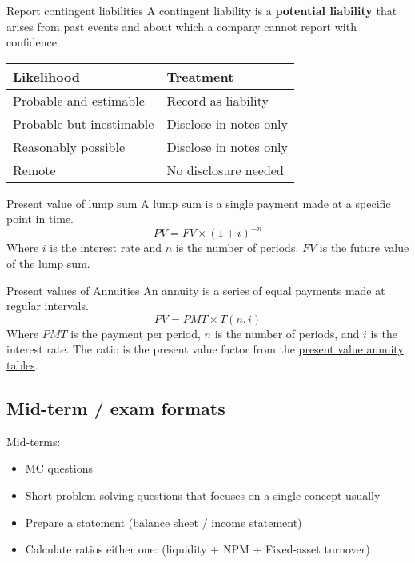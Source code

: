 \begin{theorem}
    {Report contingent liabilities}
    A contingent liability is a \textbf{potential liability} that arises from past events and about which a company cannot report with confidence.

    \begin{tabular}{|p{}|p{}|}
        \hline
        \textbf{Likelihood}      & \textbf{Treatment}     \\
        \hline
        Probable and estimable   & Record as liability    \\
        \hline
        Probable but inestimable & Disclose in notes only \\
        \hline
        Reasonably possible      & Disclose in notes only \\
        \hline
        Remote                   & No disclosure needed   \\
        \hline
    \end{tabular}
\end{theorem}

\begin{theorem}
    {Present value of lump sum}
    A lump sum is a single payment made at a specific point in time.
    \[PV = FV \times (1+i)^{-n}\]
    Where $i$ is the interest rate and $n$ is the number of periods. $FV$ is the future value of the lump sum.
\end{theorem}

\begin{theorem}
    {Present values of Annuities}
    An annuity is a series of equal payments made at regular intervals.
    \[PV = PMT \times T(n, i)\]
    Where $PMT$ is the payment per period,
    $n$ is the number of periods, and
    $i$ is the interest rate.
    The ratio is the present value factor from the \href{https://www.double-entry-bookkeeping.com/wp-content/uploads/present-value-annuity-tables-v-1.0.jpg}{present value annuity tables}.
\end{theorem}

\subsection{Mid-term / exam formats}

Mid-terms:
\begin{itemize}
    \item MC questions
    \item Short problem-solving questions that focuses on a single concept usually
    \item Prepare a statement (balance sheet / income statement)
    \item Calculate ratios either one: (liquidity + NPM + Fixed-asset turnover)
\end{itemize}


